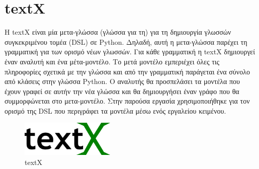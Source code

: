 \section{textX}
\label{sec:textx}

Η textX \cite{bib:textx} είναι μία μετα-γλώσσα (γλώσσα για τη) για τη δημιουργία γλωσσών συγκεκριμένου τομέα (DSL) σε Python. Δηλαδή, αυτή η μετα-γλώσσα παρέχει τη γραμματική για των ορισμό νέων γλωσσών. Για κάθε γραμματική η textX δημιουργεί έναν αναλυτή και ένα μέτα-μοντέλο. Το μετά μοντέλο εμπεριέχει όλες τις πληροφορίες σχετικά με την γλώσσα και από την γραμματική παράγεται ένα σύνολο από κλάσεις στην γλώσσα Python. Ο αναλυτής θα προσπελάσει τα μοντέλα που έχουν γραφεί σε αυτήν την νέα γλώσσα και θα δημιουργήσει έναν γράφο που θα συμμορφώνεται στο μετα-μοντέλο. Στην παρούσα εργασία χρησιμοποιήθηκε για τον ορισμό της DSL που περιγράφει τα μοντέλα μέσω ενός εργαλείου κειμένου.

\begin{figure}[!ht]
  \centering
  \includegraphics[width=0.4\textwidth]{./images/chapter4/textx.png}
  \caption[textX]{textX\footnotemark}
  \label{fig:textx}
\end{figure}

